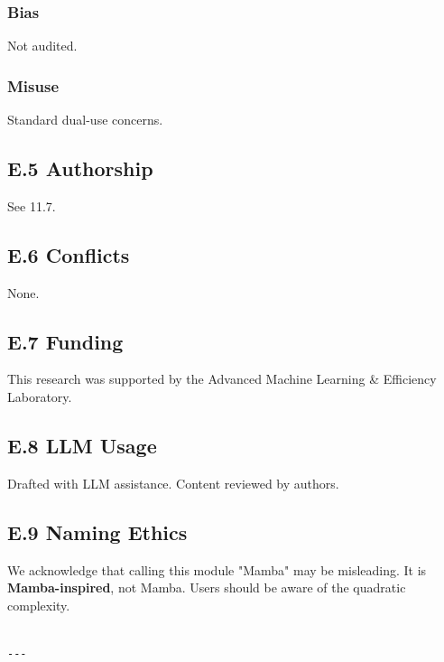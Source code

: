 \subsubsection{Bias}
Not audited.

\subsubsection{Misuse}
Standard dual-use concerns.

\subsection{E.5 Authorship}

See  11.7.

\subsection{E.6 Conflicts}

None.

\subsection{E.7 Funding}

This research was supported by the Advanced Machine Learning \& Efficiency Laboratory.

\subsection{E.8 LLM Usage}

Drafted with LLM assistance. Content reviewed by authors.

\subsection{E.9 Naming Ethics}

We acknowledge that calling this module "Mamba" may be misleading. It is 
\textbf{Mamba-inspired}, not Mamba. Users should be aware of the quadratic 
complexity.
\begin{lstlisting}

---
\end{lstlisting}